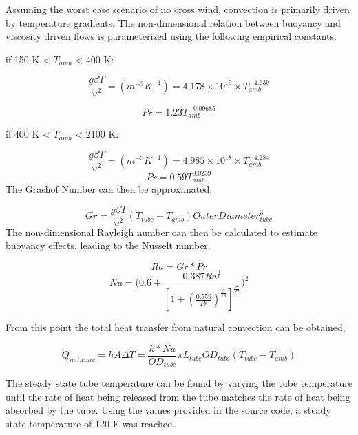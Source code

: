 \documentclass[heading.tex]{subfiles}
\begin{document}
Assuming the worst case scenario of no cross wind, convection is primarily driven by temperature gradients. The non-dimensional relation
between buoyancy and viscosity driven flows is parameterized using the following empirical constants. \cite{Berton} \cite{Incropera}

if 150 K <  $T_{amb}$ < 400 K:

\begin{equation*}
\frac{g \beta T} {\upsilon^2} = (m^{-3}K^{-1}) = 4.178\times10^{19} \times T_{amb}^{-4.639}
\end{equation*}

\begin{equation*}
Pr = 1.23 T_{amb}^{-0.09685}
\end{equation*}

if 400 K <  $T_{amb}$ < 2100 K:


\begin{equation*}
\frac{g \beta T} {\upsilon^2}  = (m^{-3}K^{-1}) = 4.985\times10^{18} \times T_{amb}^{-4.284}
\end{equation*}
\begin{equation*}
Pr = 0.59 T_{amb}^{0.0239}
\end{equation*}
The Grashof Number can then be approximated,


\begin{equation*}
Gr = \frac{g \beta T} {\upsilon^2}  (T_{tube}-T_{amb}) {OuterDiameter}_{tube}^3
\end{equation*}
The non-dimensional Rayleigh number can then be calculated to estimate buoyancy effects, leading to the Nusselt number.


\begin{equation*}
Ra = Gr * Pr
\end{equation*}
\begin{equation*}
Nu = \Bigg(0.6 + \frac{0.387Ra^{\frac{1}{6}}}{[1+(\frac{0.559}{Pr})^{\frac{9}{16}}]^{\frac{8}{27}}}\Bigg)^2
\end{equation*}

From this point the total heat transfer from natural convection can be obtained,

\begin{equation*}
Q_{nat. conv} = hA \Delta T = \frac{k*Nu}{ {OD}_{tube}} \pi {L}_{tube} {OD}_{tube} (T_{tube}-T_{amb})
\end{equation*}

The steady state tube temperature can be found by varying the tube temperature until the rate of heat being released from the tube
matches the rate of heat being absorbed by the tube. Using the values provided in the source code, a steady state temperature of 120 F
was reached.
\end{document}
